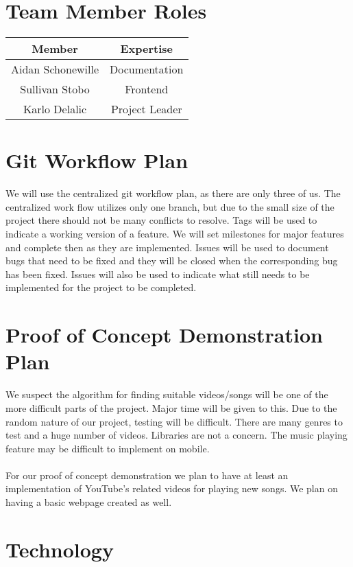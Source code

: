 \documentclass{article}
\begin{document}
\section{Team Member Roles}
\begin{tabular}{|c|c|}
\hline
Member&Expertise\\
\hline
Aidan Schonewille&Documentation\\
Sullivan Stobo&Frontend\\
Karlo Delalic&Project Leader\\
\hline
\end{tabular}
\section{Git Workflow Plan}

We will use the centralized git workflow plan, as there are only three of us. The centralized work flow utilizes only one branch, but due to the small size of the project there should not be many conflicts to resolve. Tags will be used to indicate a working version of a feature. We will set milestones for major features and complete then as they are implemented. Issues will be used to document bugs that need to be fixed and they will be closed when the corresponding bug has been fixed. Issues will also be used to indicate what still needs to be implemented for the project to be completed.


\newpage
\section{Proof of Concept Demonstration Plan}

We suspect the algorithm for finding suitable videos/songs will be one of the more difficult parts of the project. Major time will be given to this. Due to the random nature of our project, testing will be difficult. There are many genres to test and a huge number of videos. Libraries are not a concern. The music playing feature may be difficult to implement on mobile.
\\
\\
For our proof of concept demonstration we plan to have at least an implementation of YouTube’s related videos for playing new songs. We plan on having a basic webpage created as well.

\section{Technology}
\end{document}
